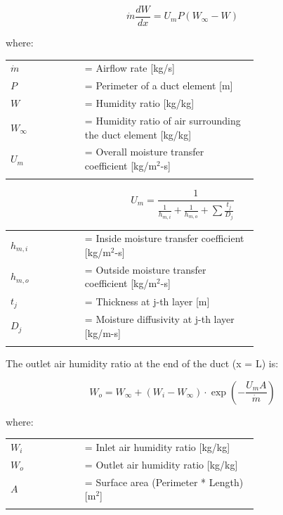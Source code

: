 \begin{equation}
\dot{m} \frac{dW}{dx} = U_m P(W_\infty - W)
\end{equation}

where:

\begin{tabular}{lp{0.7\linewidth}}
\\
$\dot{m}$ &= Airflow rate [kg/s]\\
$P$ &= Perimeter of a duct element [m]\\
$W$ &= Humidity ratio [kg/kg]\\
$W_\infty$ &= Humidity ratio of air surrounding the duct element [kg/kg]\\
$U_m$ &= Overall moisture transfer coefficient [kg/m\(^{2}\)-s]\\
\\
\end{tabular}

\begin{equation}
U_m = \frac{1}{\frac{1}{h_{m,i}} + \frac{1}{h_{m,o}} + \sum {\frac{t_j}{D_j}} }
\end{equation}

\begin{tabular}{lp{0.7\linewidth}}
\\
$h_{m,i}$ &= Inside moisture transfer coefficient [kg/m\(^{2}\)-s]\\
$h_{m,o}$ &= Outside moisture transfer coefficient [kg/m\(^{2}\)-s]\\
$t_j$ &= Thickness at j-th layer [m]\\
$D_j$ &= Moisture diffusivity at j-th layer [kg/m-s]\\
\\
\end{tabular}

The outlet air humidity ratio at the end of the duct (x = L) is:

\begin{equation}
W_o = W_\infty + (W_i - W_\infty) \cdot \exp \left(- \frac{U_m A}{\dot{m}} \right)
\end{equation}

where:

\begin{tabular}{lp{0.7\linewidth}}
\\
$W_i$ &= Inlet air humidity ratio [kg/kg]\\
$W_o$ &= Outlet air humidity ratio [kg/kg]\\
$A$ &= Surface area (Perimeter * Length) [m\(^{2}\)]\\
\\
\end{tabular}

